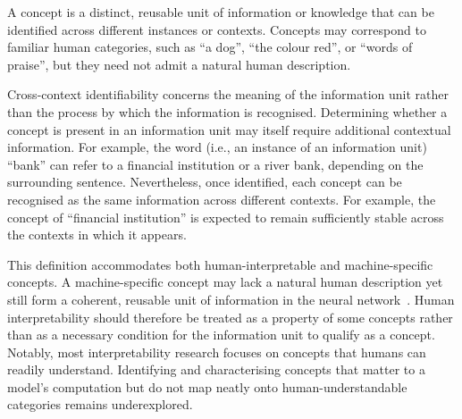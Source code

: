 \begin{definitionbox}[Concept]
A concept is a distinct, reusable unit of information or knowledge that can be identified across different instances or contexts. Concepts may correspond to familiar human categories, such as ``a dog'', ``the colour red'', or ``words of praise'', but they need not admit a natural human description.
\end{definitionbox}

Cross-context identifiability concerns the meaning of the information unit rather than the process by which the information is recognised. Determining whether a concept is present in an information unit may itself require additional contextual information. For example, the word (i.e., an instance of an information unit) ``bank'' can refer to a financial institution or a river bank, depending on the surrounding sentence. Nevertheless, once identified, each concept can be recognised as the same information across different contexts. For example, the concept of ``financial institution'' is expected to remain sufficiently stable across the contexts in which it appears.

This definition accommodates both human-interpretable and machine-specific concepts. A machine-specific concept may lack a natural human description yet still form a coherent, reusable unit of information in the neural network~. Human interpretability should therefore be treated as a property of some concepts rather than as a necessary condition for the information unit to qualify as a concept. Notably, most interpretability research focuses on concepts that humans can readily understand. Identifying and characterising concepts that matter to a model's computation but do not map neatly onto human-understandable categories remains underexplored.

